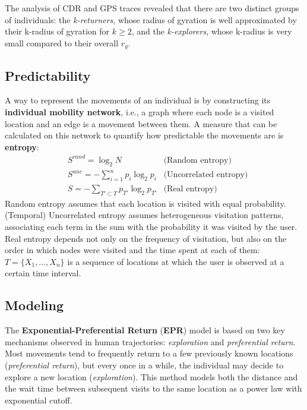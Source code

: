 The analysis of CDR and GPS traces revealed that there are two distinct groups of individuals: the \textit{k-returners}, whose radius of gyration is well approximated by their k-radius of gyration for $k \geq 2$, and the \textit{k-explorers}, whose k-radius is very small compared to their overall $r_g$.

\subsection{Predictability}
A way to represent the movements of an individual is by constructing its \textbf{individual mobility network}, i.e., a graph where each node is a visited location and an edge is a movement between them. A measure that can be calculated on this network to quantify how predictable the movements are is \textbf{entropy}:
\begin{align*}
    &S^{\textit{rand}} = \log_2 N &\text{(Random entropy)} \\
    &S^{\textit{unc}} = - \sum_{i=1}^n p_i \log_2 p_i &\text{(Uncorrelated entropy)} \\
    &S = -\sum_{T' \subset T} p_{T'} \log_2 p_{T'} &\text{(Real entropy)}
\end{align*}
Random entropy assumes that each location is visited with equal probability. (Temporal) Uncorrelated entropy assumes heterogeneous visitation patterns, associating each term in the sum with the probability it was visited by the user. Real entropy depends not only on the frequency of visitation, but also on the order in which nodes were visited and the time spent at each of them: $T = \{X_1, \dots, X_n\}$ is a sequence of locations at which the user is observed at a certain time interval.

\subsection{Modeling}

The \textbf{Exponential-Preferential Return} (\textbf{EPR}) model is based on two key mechanisms observed in human trajectories: \textit{exploration} and \textit{preferential return}. Most movements tend to frequently return to a few previously known locations (\textit{preferential return}), but every once in a while, the individual may decide to explore a new location (\textit{exploration}). This method models both the distance and the wait time between subsequent visits to the same location as a power law with exponential cutoff.

